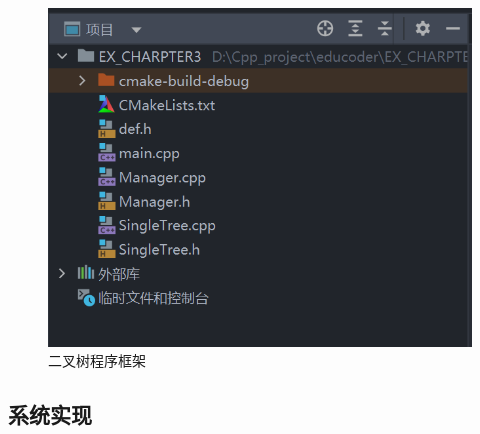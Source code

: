 \documentclass[supercite]{Experimental_Report}
\theoremstyle{definition}
\begin{document}
	\begin{figure}[H]
		\centering
		\includegraphics{images/二叉树程序架构.png}
		\caption{二叉树程序框架}
	\end{figure}

\subsection{系统实现}
\end{document}
